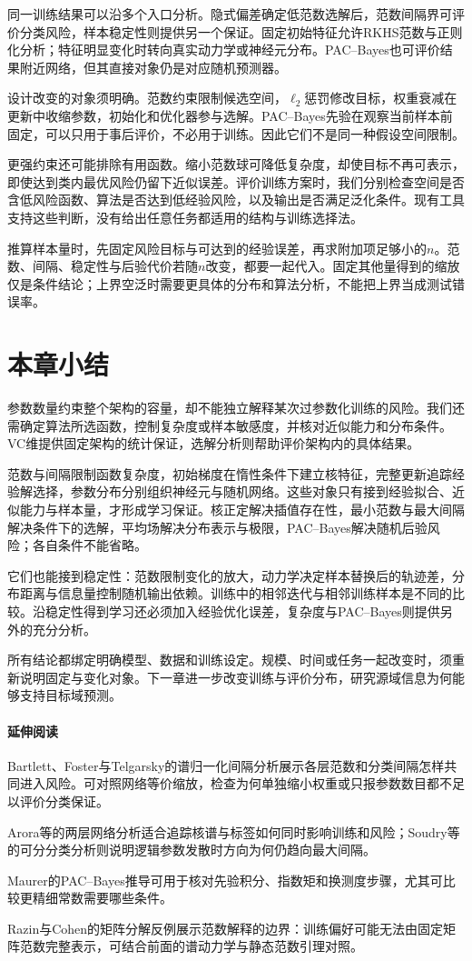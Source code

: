 同一训练结果可以沿多个入口分析。隐式偏差确定低范数选解后，范数间隔界可评价分类风险，样本稳定性则提供另一个保证。固定初始特征允许RKHS范数与正则化分析；特征明显变化时转向真实动力学或神经元分布。PAC--Bayes也可评价结果附近网络，但其直接对象仍是对应随机预测器。

设计改变的对象须明确。范数约束限制候选空间，$\ell_2$惩罚修改目标，权重衰减在更新中收缩参数，初始化和优化器参与选解。PAC--Bayes先验在观察当前样本前固定，可以只用于事后评价，不必用于训练。因此它们不是同一种假设空间限制。

更强约束还可能排除有用函数。缩小范数球可降低复杂度，却使目标不再可表示，即使达到类内最优风险仍留下近似误差。评价训练方案时，我们分别检查空间是否含低风险函数、算法是否达到低经验风险，以及输出是否满足泛化条件。现有工具支持这些判断，没有给出任意任务都适用的结构与训练选择法。

推算样本量时，先固定风险目标与可达到的经验误差，再求附加项足够小的$n$。范数、间隔、稳定性与后验代价若随$n$改变，都要一起代入。固定其他量得到的缩放仅是条件结论；上界空泛时需要更具体的分布和算法分析，不能把上界当成测试错误率。

\FloatBarrier
{}
\section{本章小结}
\label{sec:deep-learning-summary}

参数数量约束整个架构的容量，却不能独立解释某次过参数化训练的风险。我们还需确定算法所选函数，控制复杂度或样本敏感度，并核对近似能力和分布条件。VC维提供固定架构的统计保证，选解分析则帮助评价架构内的具体结果。

范数与间隔限制函数复杂度，初始梯度在惰性条件下建立核特征，完整更新追踪经验解选择，参数分布分别组织神经元与随机网络。这些对象只有接到经验拟合、近似能力与样本量，才形成学习保证。核正定解决插值存在性，最小范数与最大间隔解决条件下的选解，平均场解决分布表示与极限，PAC--Bayes解决随机后验风险；各自条件不能省略。

它们也能接到稳定性：范数限制变化的放大，动力学决定样本替换后的轨迹差，分布距离与信息量控制随机输出依赖。训练中的相邻迭代与相邻训练样本是不同的比较。沿稳定性得到学习还必须加入经验优化误差，复杂度与PAC--Bayes则提供另外的充分分析。

所有结论都绑定明确模型、数据和训练设定。规模、时间或任务一起改变时，须重新说明固定与变化对象。下一章进一步改变训练与评价分布，研究源域信息为何能够支持目标域预测。

\paragraph{延伸阅读}
Bartlett、Foster与Telgarsky的谱归一化间隔分析展示各层范数和分类间隔怎样共同进入风险。可对照网络等价缩放，检查为何单独缩小权重或只报参数数目都不足以评价分类保证。

Arora等的两层网络分析适合追踪核谱与标签如何同时影响训练和风险；Soudry等的可分分类分析则说明逻辑参数发散时方向为何仍趋向最大间隔。

Maurer的PAC--Bayes推导可用于核对先验积分、指数矩和换测度步骤，尤其可比较更精细常数需要哪些条件。

Razin与Cohen的矩阵分解反例展示范数解释的边界：训练偏好可能无法由固定矩阵范数完整表示，可结合前面的谱动力学与静态范数引理对照。

